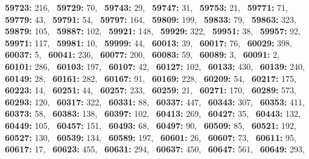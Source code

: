 \textbf{59723:} 216,\allowbreak~ 
\textbf{59729:} 70,\allowbreak~ 
\textbf{59743:} 29,\allowbreak~ 
\textbf{59747:} 31,\allowbreak~ 
\textbf{59753:} 21,\allowbreak~ 
\textbf{59771:} 71,\allowbreak~ 
\textbf{59779:} 43,\allowbreak~ 
\textbf{59791:} 54,\allowbreak~ 
\textbf{59797:} 164,\allowbreak~ 
\textbf{59809:} 199,\allowbreak~ 
\textbf{59833:} 79,\allowbreak~ 
\textbf{59863:} 323,\allowbreak~ 
\textbf{59879:} 105,\allowbreak~ 
\textbf{59887:} 102,\allowbreak~ 
\textbf{59921:} 148,\allowbreak~ 
\textbf{59929:} 322,\allowbreak~ 
\textbf{59951:} 38,\allowbreak~ 
\textbf{59957:} 92,\allowbreak~ 
\textbf{59971:} 117,\allowbreak~ 
\textbf{59981:} 10,\allowbreak~ 
\textbf{59999:} 44,\allowbreak~ 
\textbf{60013:} 39,\allowbreak~ 
\textbf{60017:} 76,\allowbreak~ 
\textbf{60029:} 398,\allowbreak~ 
\textbf{60037:} 5,\allowbreak~ 
\textbf{60041:} 236,\allowbreak~ 
\textbf{60077:} 200,\allowbreak~ 
\textbf{60083:} 59,\allowbreak~ 
\textbf{60089:} 3,\allowbreak~ 
\textbf{60091:} 2,\allowbreak~ 
\textbf{60101:} 286,\allowbreak~ 
\textbf{60103:} 197,\allowbreak~ 
\textbf{60107:} 42,\allowbreak~ 
\textbf{60127:} 102,\allowbreak~ 
\textbf{60133:} 430,\allowbreak~ 
\textbf{60139:} 240,\allowbreak~ 
\textbf{60149:} 28,\allowbreak~ 
\textbf{60161:} 282,\allowbreak~ 
\textbf{60167:} 91,\allowbreak~ 
\textbf{60169:} 228,\allowbreak~ 
\textbf{60209:} 54,\allowbreak~ 
\textbf{60217:} 175,\allowbreak~ 
\textbf{60223:} 14,\allowbreak~ 
\textbf{60251:} 44,\allowbreak~ 
\textbf{60257:} 233,\allowbreak~ 
\textbf{60259:} 21,\allowbreak~ 
\textbf{60271:} 170,\allowbreak~ 
\textbf{60289:} 573,\allowbreak~ 
\textbf{60293:} 120,\allowbreak~ 
\textbf{60317:} 322,\allowbreak~ 
\textbf{60331:} 88,\allowbreak~ 
\textbf{60337:} 447,\allowbreak~ 
\textbf{60343:} 307,\allowbreak~ 
\textbf{60353:} 411,\allowbreak~ 
\textbf{60373:} 58,\allowbreak~ 
\textbf{60383:} 138,\allowbreak~ 
\textbf{60397:} 102,\allowbreak~ 
\textbf{60413:} 269,\allowbreak~ 
\textbf{60427:} 35,\allowbreak~ 
\textbf{60443:} 132,\allowbreak~ 
\textbf{60449:} 105,\allowbreak~ 
\textbf{60457:} 151,\allowbreak~ 
\textbf{60493:} 68,\allowbreak~ 
\textbf{60497:} 90,\allowbreak~ 
\textbf{60509:} 85,\allowbreak~ 
\textbf{60521:} 192,\allowbreak~ 
\textbf{60527:} 130,\allowbreak~ 
\textbf{60539:} 134,\allowbreak~ 
\textbf{60589:} 197,\allowbreak~ 
\textbf{60601:} 26,\allowbreak~ 
\textbf{60607:} 73,\allowbreak~ 
\textbf{60611:} 95,\allowbreak~ 
\textbf{60617:} 17,\allowbreak~ 
\textbf{60623:} 455,\allowbreak~ 
\textbf{60631:} 294,\allowbreak~ 
\textbf{60637:} 450,\allowbreak~ 
\textbf{60647:} 561,\allowbreak~ 
\textbf{60649:} 293,\allowbreak~ 
